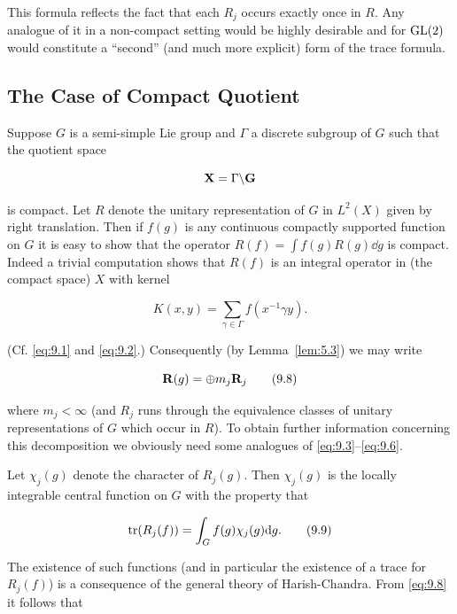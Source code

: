 This formula reflects the fact that each $R_j$ occurs exactly once in $R$. Any analogue of it in a non-compact setting would be highly desirable and for $\operatorname{GL}(2)$ would constitute a ``second'' (and much more explicit) form of the trace formula.

\subsection{The Case of Compact Quotient}

Suppose $G$ is a semi-simple Lie group and $\Gamma$ a discrete subgroup of $G$ such that the quotient space

\[
\mathbf{X} = \Gamma \backslash \mathbf{G}
\]

is compact. Let $R$ denote the unitary representation of $G$ in $L^2(X)$ given by right translation. Then if $f(g)$ is any continuous compactly supported function on $G$ it is easy to show that the operator $R(f) = \int f(g)R(g)\dd g$ is compact. Indeed a trivial computation shows that $R(f)$ is an integral operator in (the compact space) $X$ with kernel

\begin{equation}\label{eq:9.7}
K(x, y) = \sum_{\gamma \in \Gamma} f(x^{-1}\gamma y).\tag{9.7}
\end{equation}

(Cf. \eqref{eq:9.1} and \eqref{eq:9.2}.) Consequently (by Lemma~\ref{lem:5.3}) we may write

\begin{equation}\label{eq:9.8}
\mathbf{R}(g) = \oplus m_j \mathbf{R}_j\tag{9.8}
\end{equation}

where $m_j < \infty$ (and $R_j$ runs through the equivalence classes of unitary representations of $G$ which occur in $R$). To obtain further information concerning this decomposition we obviously need some analogues of \eqref{eq:9.3}--\eqref{eq:9.6}.

Let $\chi_j(g)$ denote the character of $R_j(g)$. Then $\chi_j(g)$ is the locally integrable central function on $G$ with the property that

\begin{equation}\label{eq:9.9}
\operatorname{tr}(R_j(f)) = \int_G f(g)\chi_j(g)\mathrm{d} g.\tag{9.9}
\end{equation}

The existence of such functions (and in particular the existence of a trace for $R_j(f)$) is a consequence of the general theory of Harish-Chandra. From \eqref{eq:9.8} it follows that

